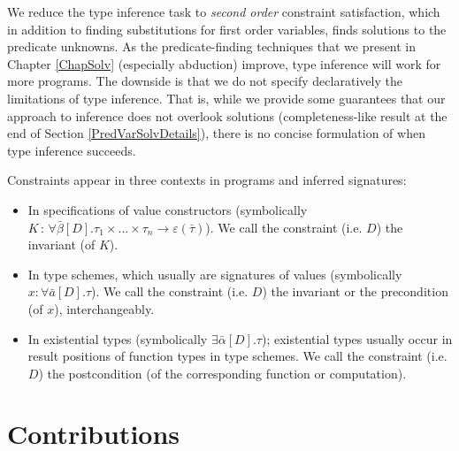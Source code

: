 \documentclass{article}
\newcommand{\colons}{\,:\,}
\newcommand{\tmem}[1]{{\em #1\/}}
\begin{document}
We reduce the type inference task to {\tmem{second order}} constraint
satisfaction, which in addition to finding substitutions for first order
variables, finds solutions to the predicate unknowns. As the predicate-finding
techniques that we present in Chapter \ref{ChapSolv} (especially abduction)
improve, type inference will work for more programs. The downside is that we
do not specify declaratively the limitations of type inference. That is, while
we provide some guarantees that our approach to inference does not overlook
solutions (completeness-like result at the end of Section
\ref{PredVarSolvDetails}), there is no concise formulation of when type
inference succeeds.

Constraints appear in three contexts in programs and inferred signatures:
\begin{itemize}
  \item In specifications of value constructors (symbolically $K \colons
  \forall \bar{\beta} [D] . \tau_1 \times \ldots \times \tau_n \longrightarrow
  \varepsilon (\bar{\tau})$). We call the constraint (i.e. $D$) the invariant
  (of $K$).
  
  \item In type schemes, which usually are signatures of values (symbolically
  $x : \forall \bar{a} [D] . \tau$). We call the constraint (i.e. $D$) the
  invariant or the precondition (of $x$), interchangeably.
  
  \item In existential types (symbolically $\exists \bar{\alpha} [D] . \tau$);
  existential types usually occur in result positions of function types in
  type schemes. We call the constraint (i.e. $D$) the postcondition (of the
  corresponding function or computation).
\end{itemize}

\section{Contributions}
\end{document}
